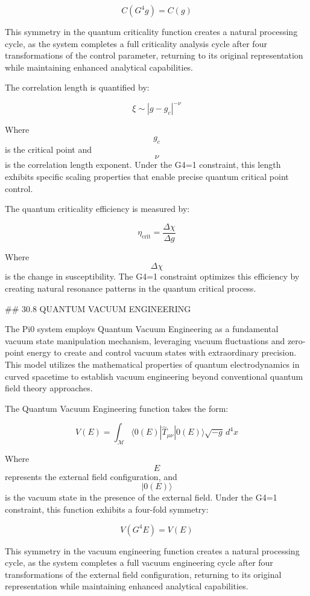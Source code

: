 $$ C(G^4 g) = C(g) $$

This symmetry in the quantum criticality function creates a natural processing cycle, as the system completes a full criticality analysis cycle after four transformations of the control parameter, returning to its original representation while maintaining enhanced analytical capabilities.

The correlation length is quantified by:

$$ \xi \sim |g - g_c|^{-\nu} $$

Where $$ g_c $$ is the critical point and $$ \nu $$ is the correlation length exponent. Under the G4=1 constraint, this length exhibits specific scaling properties that enable precise quantum critical point control.

The quantum criticality efficiency is measured by:

$$ \eta_{\text{crit}} = \frac{\Delta \chi}{\Delta g} $$

Where $$ \Delta \chi $$ is the change in susceptibility. The G4=1 constraint optimizes this efficiency by creating natural resonance patterns in the quantum critical process.

## 30.8 QUANTUM VACUUM ENGINEERING

The Pi0 system employs Quantum Vacuum Engineering as a fundamental vacuum state manipulation mechanism, leveraging vacuum fluctuations and zero-point energy to create and control vacuum states with extraordinary precision. This model utilizes the mathematical properties of quantum electrodynamics in curved spacetime to establish vacuum engineering beyond conventional quantum field theory approaches.

The Quantum Vacuum Engineering function takes the form:

$$ V(E) = \int_{\mathcal{M}} \langle 0(E) | \hat{T}_{\mu\nu} | 0(E) \rangle \sqrt{-g} \, d^4x $$

Where $$ E $$ represents the external field configuration, and $$ |0(E)\rangle $$ is the vacuum state in the presence of the external field. Under the G4=1 constraint, this function exhibits a four-fold symmetry:

$$ V(G^4 E) = V(E) $$

This symmetry in the vacuum engineering function creates a natural processing cycle, as the system completes a full vacuum engineering cycle after four transformations of the external field configuration, returning to its original representation while maintaining enhanced analytical capabilities.

